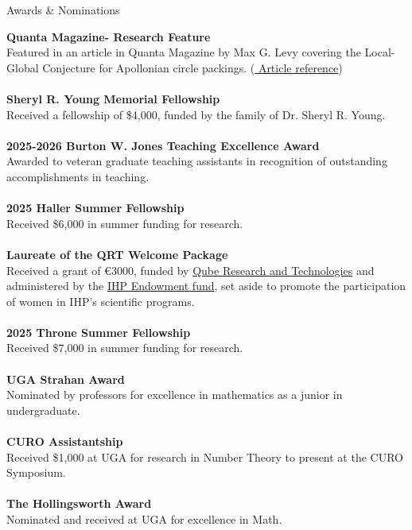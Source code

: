 \documentclass{resume} %
\begin{document}
\newpage
\begin{rSection}{Awards \& Nominations}


{\bf Quanta Magazine- Research Feature} \\
Featured in an article in Quanta Magazine by Max G. Levy covering the Local-Global Conjecture for
Apollonian circle packings. (\href{https://www.quantamagazine.org/two-students-unravel-a-widely-believed-math-conjecture-20230810/}{ Article reference})  \\
\\{\bf Sheryl R. Young Memorial Fellowship}\\
Received a fellowship of \$4,000, funded by the family of Dr. Sheryl R. Young. \\
\\{\bf 2025-2026 Burton W. Jones Teaching Excellence Award}\\
Awarded to veteran graduate teaching assistants in recognition of outstanding accomplishments in teaching.\\
\\{\bf 2025 Haller Summer Fellowship}\\
Received \$6,000 in summer funding for research.\\
\\{\bf Laureate of the QRT Welcome Package}\\
Received a grant of \euro3000, funded by \href{https://www.qube-rt.com/}{Qube Research and Technologies} and administered by the \href{https://www.fonds-ihp.org/}{IHP Endowment fund}, set aside to promote the participation of women in IHP's scientific programs.\\
\\{\bf 2025 Throne Summer Fellowship}\\
Received \$7,000 in summer funding for research.\\
\\{\bf UGA Strahan Award} \\
Nominated by professors for excellence in mathematics as a junior in undergraduate.\\
\\{\bf CURO Assistantship}\\
Received \$1,000 at UGA for research in Number Theory to present at the CURO Symposium.\\
\\{\bf The Hollingsworth Award}
\\ Nominated and received at UGA for excellence in Math.\\

\end{rSection}
\end{document}
